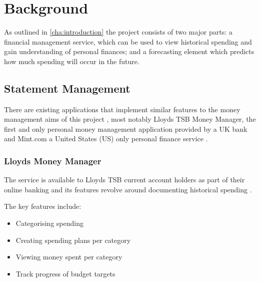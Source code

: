 \chapter{Background}
\label{cha:background}

\begin{comment}
Chapter 2: Background and literature survey
This chapter should give essential background information with references to published material in research papers, books, URLs, magazine articles and even newspapers. Expand on any references to other work that have been mentioned in Chapter 1. Refer to the notes on references (below) for the preferred way of referencing publications. The reader, stimulated by the presentation of ideas in this section, may be led to consult some or all of the referenced publications. This section will be useful for any student in a subsequent year who wishes to take the project further.
\end{comment}

As outlined in \autoref{cha:introduction} the project consists of two major parts: a financial management service, which can be used to view historical spending and gain understanding of personal finances; and a forecasting element which predicts how much spending will occur in the future. 

\section{Statement Management}
There are existing applications that implement similar features to the money management aims of this project , most notably Lloyds TSB Money Manager, the first and only personal money management application provided by a UK bank and Mint.com a United States (US) only personal finance service \parencite{lloyds2014moneymanager, mint2014whatismint}.

\subsection{Lloyds Money Manager}
The service is available to Lloyds TSB current account holders as part of their online banking and its features revolve around documenting historical spending \parencite{lloyds2014money}.

The key features include:
\begin{itemize}
\item Categorising spending
\item Creating spending plans per category
\item Viewing money spent per category
\item Track progress of budget targets
\end{itemize}

